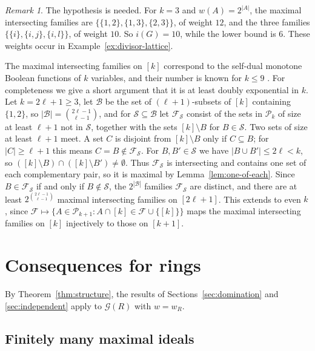 \documentclass[11pt]{amsart}
\theoremstyle{definition}
\theoremstyle{remark}
\newtheorem{remark}[theorem]{Remark}
\newcommand{\G}{\mathcal{G}}
\newcommand{\Pk}{\mathcal{P}_k}
\newcommand{\F}{\mathcal{F}}
\begin{document}
\begin{remark}\label{rem:i-fails}
The hypothesis is needed. For $k=3$ and $w(A)=2^{|A|}$, the maximal intersecting families are
$\{\{1,2\},\{1,3\},\{2,3\}\}$, of weight $12$, and the three families $\{\{i\},\{i,j\},\{i,l\}\}$, of
weight $10$. So $i(G)=10$, while the lower bound is $6$. These weights occur in
Example~\ref{ex:divisor-lattice}.
\end{remark}

The maximal intersecting families on $[k]$ correspond to the self-dual monotone Boolean functions
of $k$ variables, and their number is known for $k\le9$ \cite{BMMV13}. For completeness we give a
short argument that it is at least doubly exponential in $k$. Let $k=2\ell+1\ge3$, let $\mathcal B$ be
the set of $(\ell+1)$-subsets of $[k]$ containing $\{1,2\}$, so $|\mathcal B|=\binom{2\ell-1}{\ell-1}$, and
for $\mathcal S\subseteq\mathcal B$ let $\F_{\mathcal S}$ consist of the sets in $\Pk$ of size at
least $\ell+1$ not in $\mathcal S$, together with the sets $[k]\setminus B$ for $B\in\mathcal S$. Two sets of size at
least $\ell+1$ meet. A set $C$ is disjoint from $[k]\setminus B$ only if $C\subseteq B$; for
$|C|\ge \ell+1$ this means $C=B\notin\F_{\mathcal S}$. For $B,B'\in\mathcal S$ we have
$|B\cup B'|\le 2\ell<k$, so $([k]\setminus B)\cap([k]\setminus B')\neq\emptyset$. Thus
$\F_{\mathcal S}$ is intersecting and contains one set of each complementary pair, so it is maximal
by Lemma~\ref{lem:one-of-each}. Since $B\in\F_{\mathcal S}$ if and only if $B\notin\mathcal S$, the
$2^{|\mathcal B|}$ families $\F_{\mathcal S}$ are distinct, and there are at least
$2^{\binom{2\ell-1}{\ell-1}}$ maximal intersecting families on $[2\ell+1]$. This extends to even $k$, since
$\F\mapsto\{A\in\mathcal P_{k+1}:A\cap[k]\in\F\cup\{[k]\}\}$ maps the maximal intersecting families
on $[k]$ injectively to those on $[k+1]$.

\section{Consequences for rings}\label{sec:rings}

By Theorem~\ref{thm:structure}, the results of Sections~\ref{sec:domination} and
\ref{sec:independent} apply to $\G(R)$ with $w=w_R$.

\subsection{Finitely many maximal ideals}
\end{document}
